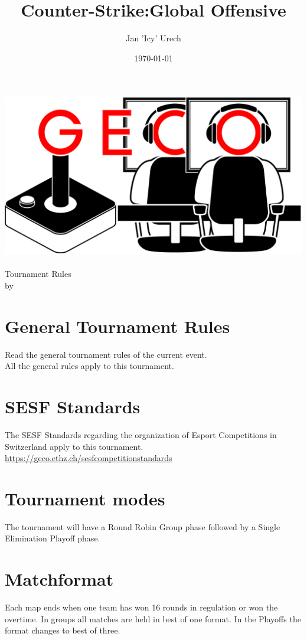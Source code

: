 \documentclass{article}
\title{Counter-Strike:Global Offensive}
\author{Jan 'Icy' Urech }
\date{\today}
\begin{document}
\makeatletter
\begin{titlepage}
\centering
\includegraphics[scale=0.075]{../img/GECo.png}\\
\LARGE \@title\\ Tournament Rules\\ \normalsize by \@author\\ \@date
\end{titlepage}
\makeatother


\clearpage

\tableofcontents
\clearpage

\section{General Tournament Rules}
Read the general tournament rules of the current event.\\
All the general rules apply to this tournament.

\section{SESF Standards}
The SESF Standards regarding the organization of Esport Competitions in Switzerland apply to this tournament. \url{https://geco.ethz.ch/sesfcompetitionstandards}

\section{Tournament modes}
The tournament will have a Round Robin Group phase followed by a Single Elimination Playoff phase.

\section{Matchformat}
Each map ends when one team has won 16 rounds in regulation or won the overtime.
In groups all matches are held in best of one format. In the Playoffs the format changes to best of three.
\end{document}
